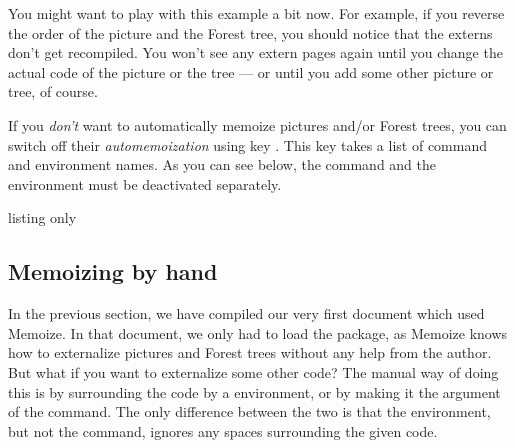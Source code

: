 \documentclass[a4paper,11pt]{article}
\begin{document}

You might want to play with this example a bit now.
For example, if you reverse the order of the \TikZ picture and the Forest
tree, you should notice that the externs don't get recompiled.  You won't see
any extern pages again until you change the actual code of the picture or the
tree --- or until you add some other picture or tree, of course.

If you \emph{don't} want to automatically memoize \TikZ pictures and/or Forest
trees, you can switch off their \emph{automemoization} using key
.  This key takes a list of command and environment
names.  As you can see below, the command and the environment must be
deactivated separately.

\begin{tcblisting}{listing only}
\end{tcblisting}


\subsection{Memoizing by hand}
\label{sec:tut:memoize}

In the previous section, we have compiled our very first document which used
Memoize.  In that document, we only had to load the package, as Memoize knows
how to externalize \TikZ pictures and Forest trees without any help from the
author.  But what if you want to externalize some other code?  The manual way of
doing this is by surrounding the code by a  environment,
or by making it the argument of the  command.  The only
difference between the two is that the environment, but not the command,
ignores any spaces surrounding the given code.

\end{document}
